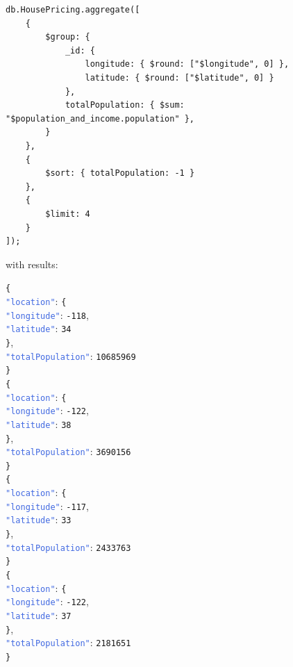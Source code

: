 \documentclass{Configuration_Files/PoliMi3i_thesis}
\newcommand{\jsonkey}[1]{\textcolor{RoyalBlue}{\texttt{"#1"}}}
\newcommand{\jsonnumber}[1]{\textcolor{BrickRed}{\texttt{#1}}}
\begin{document}
\begin{lstlisting}[language=MongoDB]
db.HousePricing.aggregate([
    {
        $group: {
            _id: {
                longitude: { $round: ["$longitude", 0] }, 
                latitude: { $round: ["$latitude", 0] }   
            },
            totalPopulation: { $sum: "$population_and_income.population" },
        }
    },
    {
        $sort: { totalPopulation: -1 } 
    },
    {
        $limit: 4 
    }
]);
\end{lstlisting}

with results: 

\noindent
\texttt{\{} \\
\jsonkey{location}: \texttt{\{} \\
\hspace*{1em} \jsonkey{longitude}: \jsonnumber{-118}, \\
\hspace*{1em} \jsonkey{latitude}: \jsonnumber{34} \\
\texttt{\}}, \\
\jsonkey{totalPopulation}: \jsonnumber{10685969} \\
\texttt{\}} \\


\noindent
\texttt{\{} \\
\jsonkey{location}: \texttt{\{} \\
\hspace*{1em} \jsonkey{longitude}: \jsonnumber{-122}, \\
\hspace*{1em} \jsonkey{latitude}: \jsonnumber{38} \\
\texttt{\}}, \\
\jsonkey{totalPopulation}: \jsonnumber{3690156} \\
\texttt{\}} \\


\noindent
\texttt{\{} \\
\jsonkey{location}: \texttt{\{} \\
\hspace*{1em} \jsonkey{longitude}: \jsonnumber{-117}, \\
\hspace*{1em} \jsonkey{latitude}: \jsonnumber{33} \\
\texttt{\}}, \\
\jsonkey{totalPopulation}: \jsonnumber{2433763} \\
\texttt{\}} \\


\noindent
\texttt{\{} \\
\jsonkey{location}: \texttt{\{} \\
\hspace*{1em} \jsonkey{longitude}: \jsonnumber{-122}, \\
\hspace*{1em} \jsonkey{latitude}: \jsonnumber{37} \\
\texttt{\}}, \\
\jsonkey{totalPopulation}: \jsonnumber{2181651} \\
\texttt{\}}
\end{document}
